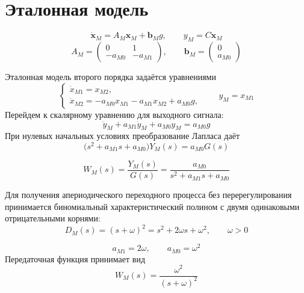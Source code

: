 \section{Эталонная модель}

\begin{equation}
  \dot{\bm x}_M=A_M\bm x_M+\bm b_M g,
  \qquad y_M=C\bm x_M
\end{equation}
\begin{equation}
  A_M=\begin{pmatrix}0&1\\-a_{M0}&-a_{M1}\end{pmatrix},
  \qquad \bm b_M=\begin{pmatrix}0\\a_{M0}\end{pmatrix}
\end{equation}

Эталонная модель второго порядка задаётся уравнениями
\begin{equation}
  \begin{cases}
    \dot x_{M1}=x_{M2},\\
    \dot x_{M2}=-a_{M0}x_{M1}-a_{M1}x_{M2}+a_{M0}g,
  \end{cases}
  \qquad y_M=x_{M1}
\end{equation}
Перейдем к скалярному уравнению для выходного сигнала:
\begin{equation}
  \ddot y_M+a_{M1}\dot y_M+a_{M0}y_M=a_{M0}g
\end{equation}
При нулевых начальных условиях преобразование Лапласа даёт
\begin{equation}
  \bigl(s^2+a_{M1}s+a_{M0}\bigr)Y_M(s)=a_{M0}G(s)
\end{equation}

\begin{equation}
  W_M(s)=\frac{Y_M(s)}{G(s)}
  =\frac{a_{M0}}{s^2+a_{M1}s+a_{M0}}
\end{equation}

Для получения апериодического переходного процесса без перерегулирования
принимается биномиальный характеристический полином с двумя одинаковыми
отрицательными корнями:
\begin{equation}
  D_M(s)=(s+\omega)^2=s^2+2\omega s+\omega^2,
  \qquad \omega>0
\end{equation}

\begin{equation}
  a_{M1}=2\omega,
  \qquad a_{M0}=\omega^2
\end{equation}
Передаточная функция принимает вид
\begin{equation}
  W_M(s)=\frac{\omega^2}{(s+\omega)^2}
\end{equation}

